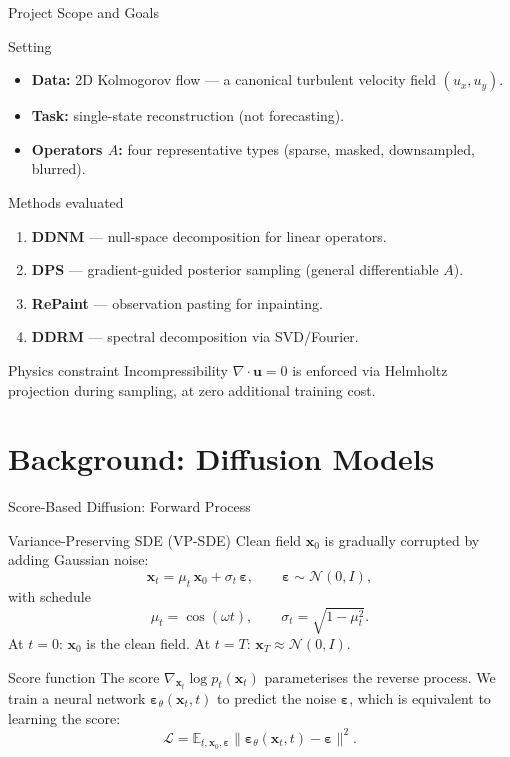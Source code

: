 \documentclass[9pt]{beamer}
\begin{document}
\begin{frame}{Project Scope and Goals}
\begin{block}{Setting}
\begin{itemize}
  \item \textbf{Data:} 2D Kolmogorov flow — a canonical turbulent velocity field $(u_x, u_y)$.
  \item \textbf{Task:} single-state reconstruction (not forecasting).
  \item \textbf{Operators $A$:} four representative types (sparse, masked, downsampled, blurred).
\end{itemize}
\end{block}
\begin{block}{Methods evaluated}
\begin{enumerate}
  \item \textbf{DDNM} — null-space decomposition for linear operators.
  \item \textbf{DPS} — gradient-guided posterior sampling (general differentiable $A$).
  \item \textbf{RePaint} — observation pasting for inpainting.
  \item \textbf{DDRM} — spectral decomposition via SVD/Fourier.
\end{enumerate}
\end{block}
\begin{block}{Physics constraint}
Incompressibility $\nabla \cdot \mathbf{u} = 0$ is enforced via Helmholtz projection during sampling,
at zero additional training cost.
\end{block}
\end{frame}

\section{Background: Diffusion Models}

\begin{frame}{Score-Based Diffusion: Forward Process}
\begin{block}{Variance-Preserving SDE (VP-SDE)}
Clean field $\mathbf{x}_0$ is gradually corrupted by adding Gaussian noise:
\[
  \mathbf{x}_t = \mu_t\,\mathbf{x}_0 + \sigma_t\,\boldsymbol{\varepsilon},
  \qquad \boldsymbol{\varepsilon} \sim \mathcal{N}(0, I),
\]
with schedule
\[
  \mu_t = \cos(\omega t), \qquad \sigma_t = \sqrt{1 - \mu_t^2}.
\]
At $t=0$: $\mathbf{x}_0$ is the clean field. At $t=T$: $\mathbf{x}_T \approx \mathcal{N}(0, I)$.
\end{block}
\begin{block}{Score function}
The score $\nabla_{\mathbf{x}_t}\log p_t(\mathbf{x}_t)$ parameterises the reverse process.
We train a neural network $\boldsymbol{\varepsilon}_\theta(\mathbf{x}_t, t)$ to predict the noise $\boldsymbol{\varepsilon}$,
which is equivalent to learning the score:
\[
  \mathcal{L} = \mathbb{E}_{t,\mathbf{x}_0,\boldsymbol{\varepsilon}}\bigl\|\boldsymbol{\varepsilon}_\theta(\mathbf{x}_t, t) - \boldsymbol{\varepsilon}\bigr\|^2.
\]
\end{block}
\end{frame}
\end{document}
